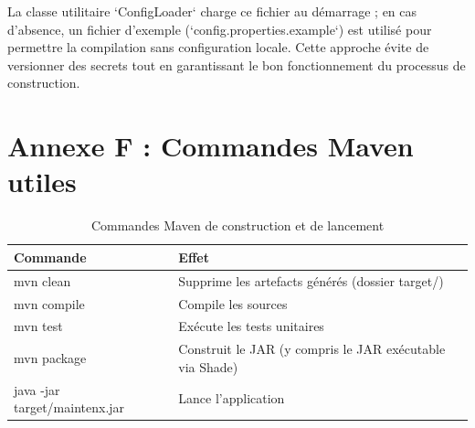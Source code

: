 \documentclass[11pt,a4paper]{report}
\begin{document}
La classe utilitaire `ConfigLoader` charge ce fichier au démarrage ; en cas d'absence, un fichier d'exemple (`config.properties.example`) est utilisé pour permettre la compilation sans configuration locale. Cette approche évite de versionner des secrets tout en garantissant le bon fonctionnement du processus de construction.
\section*{Annexe F : Commandes Maven utiles}
\begin{table}[htbp]\centering\small
\begin{tabularx}{\textwidth}{|p{3.8cm}|X|}
\hline\rowcolor{hdr}\textbf{Commande} & \textbf{Effet}\\ \hline
mvn clean & Supprime les artefacts générés (dossier target/)\\ \hline
mvn compile & Compile les sources\\ \hline
mvn test & Exécute les tests unitaires\\ \hline
mvn package & Construit le JAR (y compris le JAR exécutable via Shade)\\ \hline
java -jar target/maintenx.jar & Lance l'application\\ \hline
\end{tabularx}
\caption{Commandes Maven de construction et de lancement}
\end{table}
\end{document}
